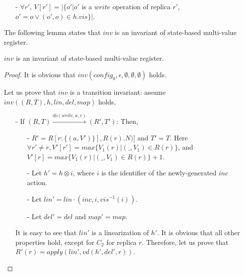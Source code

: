 {\begin{itemize}
\setlength{\itemsep}{0.5pt}
\item[-] $\forall r'$, $V[r'] = \vert \{ o' \vert o'$ is a $\mathit{write}$ operation of replica $r'$, $o' = o \vee (o',o) \in h.\mathit{vis} \} \vert$.
\end{itemize}

The following lemma states that $\mathit{inv}$ is an invariant of state-based multi-value register.

\begin{lemma}
\label{lemma:inv is an invariant of state-based CRDT for state-based multi-value register}
$\mathit{inv}$ is an invariant of state-based multi-value register.
\end{lemma}

\begin {proof}

It is obvious that $\mathit{inv}(\mathit{config}_0,\epsilon,\emptyset,\emptyset,\emptyset)$ holds.

Let us prove that $\mathit{inv}$ is a transition invariant: assume $\mathit{inv}((R,T),h,\mathit{lin},\mathit{del},\mathit{map})$ holds,

\begin{itemize}
\setlength{\itemsep}{0.5pt}
\item[-] If $(R,T) {\xrightarrow{\mathit{do}(\mathit{write},a,r)}} (R',T')$: Then,

    \begin{itemize}
    \setlength{\itemsep}{0.5pt}
    \item[-] $R' = R[ r: \{ (a,V') \} ], R(r).N)]$ and $T' = T$. Here $\forall r' \neq r, V'[r'] = \mathit{max} \{ V_1(r) \vert (\_,V_1) \in R(r) \}$, and $V'[r] = \mathit{max} \{ V_1(r) \vert (\_,V_1) \in R(r) \} + 1$.

    \item[-] Let $h' = h \otimes i$, where $i$ is the identifier of the newly-generated $\mathit{inc}$ action.

    \item[-] Let $\mathit{lin}' = \mathit{lin} \cdot (\mathit{inc},i,\mathit{vis}^{-1}(i))$.

    \item[-] Let $\mathit{del}' = \mathit{del}$ and $\mathit{map}' = \mathit{map}$.
    \end{itemize}

    It is easy to see that $\mathit{lin}'$ is a linearization of $h'$. It is obvious that all other properties hold, except for $C_2$ for replica $r$. Therefore, let us prove that $R'(r) = \mathit{apply}(\mathit{lin}',\mathit{vd}(h',\mathit{del}',r))$.


\end{itemize}
\end{proof}}
